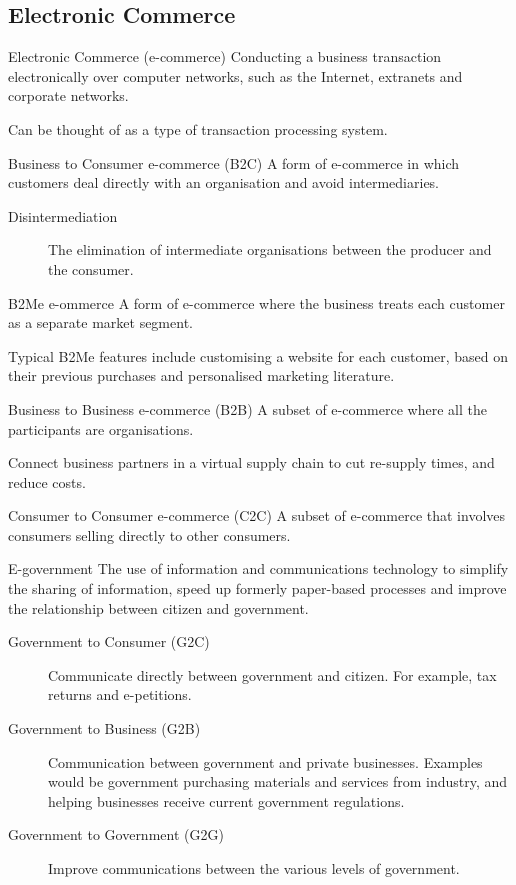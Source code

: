 \documentclass[\main/notes.tex]{subfiles}
\begin{document}
			\subsection{Electronic Commerce}
				\begin{definition}{Electronic Commerce (e-commerce)}
					Conducting a business transaction electronically over computer networks, such as the Internet, extranets and corporate networks.

					Can be thought of as a type of transaction processing system.
				\end{definition}
				\begin{definition}{Business to Consumer e-commerce (B2C)}
					A form of e-commerce in which customers deal directly with an organisation and avoid intermediaries.
					\begin{description}
						\item[Disintermediation] The elimination of intermediate organisations between the producer and the consumer.
					\end{description}
				\end{definition}
				\begin{definition}{B2Me e-ommerce}
					A form of e-commerce where the business treats each customer as a separate market segment.

					Typical B2Me features include customising a website for each customer, based on their previous purchases and personalised marketing literature.
				\end{definition}
				\begin{definition}{Business to Business e-commerce (B2B)}
					A subset of e-commerce where all the participants are organisations.

					Connect business partners in a virtual supply chain to cut re-supply times, and reduce costs.
				\end{definition}
				\begin{definition}{Consumer to Consumer e-commerce (C2C)}
					A subset of e-commerce that involves consumers selling directly to other consumers.
				\end{definition}
				\begin{definition}{E-government}
					The use of information and communications technology to simplify the sharing of information, speed up formerly paper-based processes and improve the relationship between citizen and government.
					\begin{description}
						\item[Government to Consumer (G2C)] Communicate directly between government and citizen. For example, tax returns and e-petitions.
						\item[Government to Business (G2B)] Communication between government and private businesses. Examples would be government purchasing materials and services from industry, and helping businesses receive current government regulations.
						\item[Government to Government (G2G)] Improve communications between the various levels of government. 
					\end{description}
				\end{definition}
\end{document}
